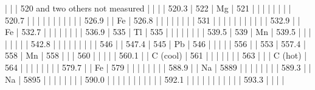\documentclass[a4paper, 12pt, oneside, polutonikogreek, english]{article}
\begin{document}
|            |             | 520 and two others not measured |              |             |         | 520.3           | 522       | Mg            | 521          |
|            |             |                 |              |             |         | 520.7           |         |              |            |
|            |             |                 |              |             |         | 526.9           |         | Fe            | 526.8         |
|            |             |                 |              |             |         | 531            |         |              |            |
|            |             |                 |              |             |         | 532.9           |         | Fe            | 532.7         |
|            |             |                 |              |             |         | 536.9           | 535       | Tl            | 535          |
|            |             |                 |              |             |         | 539.5           | 539       | Mn            | 539.5         |
|            |             |                 |              |             |         | 542.8           |         |              |            |
|            |             |                 |              | 546           |         | 547.4           | 545       | Pb            | 546          |
|            |             |                 | 556            |             | 553       | 557.4           | 558       | Mn            | 558          |
|            | 560           |                 |              |             |         | 560.1           |         | C (cool)         | 561          |
|            |             |                 |              |             | 563       |              |         | C (hot)          | 564          |
|            |             |                 |              |             |         | 579.7           |         | Fe            | 579          |
|            |             |                 |              |             |         | 588.9           |         | Na            | 5889         |
|            |             |                 |              |             |         | 589.3           |         | Na            | 5895         |
|            |             |                 |              |             |         | 590.0           |         |              |            |
|            |             |                 |              |             |         | 592.1           |         |              |            |
|            |             |                 |              |             |         | 593.3           |         |              |            |
\end{document}
